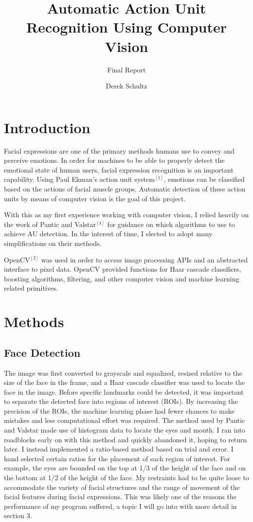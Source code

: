 \documentclass[13pt,letterpaper]{scrartcl}
\author{Derek Schultz}
\title{Automatic Action Unit Recognition Using Computer Vision}
\subtitle{Final Report}
\begin{document}
	\begin{titlepage}
		\maketitle	
	\end{titlepage}

	\section{Introduction}
	Facial expressions are one of the primary methods humans use to convey and perceive emotions. In order for machines to be able to properly detect the emotional state of human users, facial expression recognition is an important capability. Using Paul Ekman's action unit system$^{[1]}$, emotions can be classified based on the actions of facial muscle groups. Automatic detection of these action units by means of computer vision is the goal of this project.
	
	With this as my first experience working with computer vision, I relied heavily on the work of Pantic and Valstar$^{[4]}$ for guidance on which algorithms to use to achieve AU detection. In the interest of time, I elected to adopt many simplifications on their methods.
	
	OpenCV$^{[2]}$ was used in order to access image processing APIs and an abstracted interface to pixel data. OpenCV provided functions for Haar cascade classifiers, boosting algorithms, filtering, and other computer vision and machine learning related primitives.
	
	\section{Methods}
	\subsection{Face Detection}
	The image was first converted to grayscale and equalized, resized relative to the size of the face in the frame, and a Haar cascade classifier was used to locate the face in the image. Before specific landmarks could be detected, it was important to separate the detected face into regions of interest (ROIs). By increasing the precision of the ROIs, the machine learning phase had fewer chances to make mistakes and less computational effort was required. The method used by Pantic and Valstar made use of histogram data to locate the eyes and mouth. I ran into roadblocks early on with this method and quickly abandoned it, hoping to return later. I instead implemented a ratio-based method based on trial and error. I hand selected certain ratios for the placement of each region of interest. For example, the eyes are bounded on the top at 1/3 of the height of the face and on the bottom at 1/2 of the height of the face. My restraints had to be quite loose to accommodate the variety of facial structures and the range of movement of the facial features during facial expressions. This was likely one of the reasons the performance of my program suffered, a topic I will go into with more detail in section 3.
	
\end{document}
